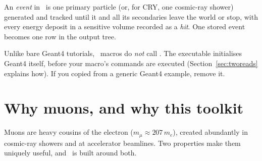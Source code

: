 \begin{center}
\end{center}

\begin{keypoint}
An \emph{event} in \musrSim\ is one primary particle (or, for CRY, one cosmic-ray shower) generated and tracked until it and all its secondaries leave the world or stop, with every energy deposit in a sensitive volume recorded as a \emph{hit}. One stored event becomes one row in the output tree.
\end{keypoint}

\begin{pitfall}
Unlike bare Geant4 tutorials, \musrSim\ macros do \emph{not} call . The executable initialises Geant4 itself, before your macro's commands are executed (Section~\ref{sec:tworeads} explains how). If you copied  from a generic Geant4 example, remove it.
\end{pitfall}

\section{Why muons, and why this toolkit}
Muons are heavy cousins of the electron (\(m_\mu\approx207\,m_e\)), created abundantly in cosmic-ray showers and at accelerator beamlines. Two properties make them uniquely useful, and \musrSim\ is built around both.

